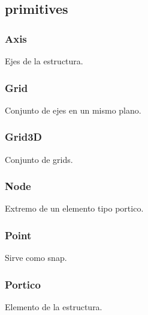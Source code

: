 \subsection{primitives}
\subsubsection{Axis}
Ejes de la estructura.
\subsubsection{Grid}
Conjunto de ejes en un mismo plano.
\subsubsection{Grid3D}
Conjunto de grids.
\subsubsection{Node}
Extremo de un elemento tipo portico.
\subsubsection{Point}
Sirve como snap.
\subsubsection{Portico}
Elemento de la estructura.



